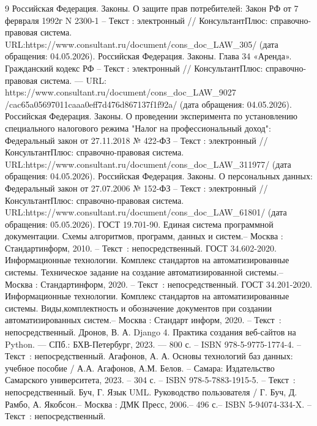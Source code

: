 
\begin{thebibliography}{9}
     Российская Федерация. Законы. О защите прав потребителей: Закон РФ от 7 фервраля 1992г N 2300-1 -- Текст : электронный // КонсультантПлюс: справочно-правовая система. URL:https://www.consultant.ru/document/cons\_doc\_LAW\_305/ (дата обращения: 04.05.2026).
     Российская Федерация. Законы. Глава 34 «Аренда». Гражданский кодекс РФ -- Текст : электронный // КонсультантПлюс: справочно-правовая система. — URL: https://www.consultant.ru/document/cons\_doc\_LAW\_9027
    /cac65a05697011caaa0eff7d476d867137f1f92a/ (дата обращения: 04.05.2026).
     Российская Федерация. Законы. О проведении эксперимента по установлению специального налогового режима "Налог на профессиональный доход": Федеральный закон от 27.11.2018 № 422-ФЗ -- Текст : электронный // КонсультантПлюс: справочно-правовая система. URL:https://www.consultant.ru/document/cons\_doc\_LAW\_311977/ (дата обращения: 04.05.2026).
     Российская Федерация. Законы. О персональных данных: Федеральный закон от 27.07.2006 № 152-ФЗ -- Текст : электронный // КонсультантПлюс: справочно-правовая система. URL:https://www.consultant.ru/document/cons\_doc\_LAW\_61801/ (дата обращения: 05.05.2026).
     ГОСТ 19.701-90. Единая система программной документации. Схемы алгоритмов, программ, данных и систем.– Москва : Стандартинформ, 2010. – Текст~: непосредственный.
     ГОСТ 34.602-2020. Информационные технологии. Комплекс стандартов на автоматизированные системы. Техническое задание на создание автоматизированной системы.– Москва : Стандартинформ, 2020. – Текст~: непосредственный.
     ГОСТ 34.201-2020. Информационные технологии. Комплекс стандартов на автоматизированные системы. Виды,комплектность и обозначение документов при создании автоматизированных систем.– Москва : Стандарт информ, 2020. – Текст~: непосредственный.
     Дронов, В. А. Django 4. Практика создания веб-сайтов на Python. — СПб.: БХВ-Петербург, 2023. — 800 с. -- ISBN 978-5-9775-1774-4. -- Текст~: непосредственный.
     Агафонов, А. А. Основы технологий баз данных: учебное пособие / А.А. Агафонов, А.М. Белов. – Самара: Издательство Самарского университета, 2023. – 304 с. -- ISBN 978-5-7883-1915-5. -- Текст~: непосредственный.
     Буч, Г. Язык UML. Руководство пользователя / Г. Буч, Д. Рамбо, А. Якобсон.– Москва : ДМК Пресс, 2006.– 496 с.– ISBN 5-94074-334-X. -- Текст~: непосредственный.

\end{thebibliography}
